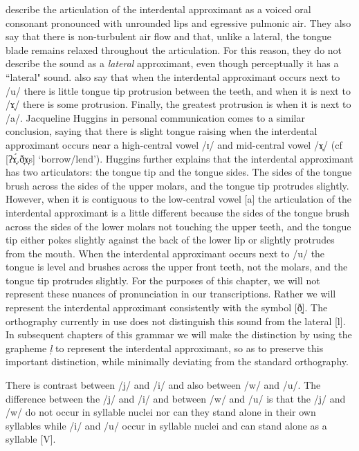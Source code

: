 \citet{olson2010} describe the articulation of the interdental approximant as a voiced oral consonant pronounced with unrounded lips and egressive pulmonic air. They also say that there is non-turbulent air flow and that, unlike a lateral, the tongue blade remains relaxed throughout the articulation. For this reason, they do not describe the sound as a \textit{lateral} approximant, even though perceptually it has a ``lateral" sound. 
\citet{olson2008} also say that when the interdental approximant occurs next to /u/ there is little tongue tip protrusion between the teeth, and when it is next to /ɤ̞/ there is some protrusion. Finally, the greatest protrusion is when it is next to /a/. Jacqueline Huggins in personal communication comes to a similar conclusion, saying that there is slight tongue raising when the interdental approximant occurs near a high-central vowel /ɪ/ and mid-central vowel /ɤ̞/ (cf [ʔɤ̞́.ð̞ɤ̞s] `borrow/lend'). Huggins further explains that the interdental approximant has two articulators: the tongue tip and the tongue sides. The sides of the tongue brush across the sides of the upper molars, and the tongue tip protrudes slightly. However, when it is contiguous to the low-central vowel [a] the articulation of the interdental approximant is a little different because the sides of the tongue brush across the sides of the lower molars not touching the upper teeth, and the tongue tip either pokes slightly against the back of the lower lip or slightly protrudes from the mouth. When the interdental approximant occurs next to /u/ the tongue is level and brushes across the upper front teeth, not the molars, and the tongue tip protrudes slightly. 
For the purposes of this chapter, we will not represent these nuances of pronunciation in our transcriptions. Rather we will represent the interdental approximant consistently with the symbol [ð̞]. The orthography currently in use does not distinguish this sound from the lateral [l]. In subsequent chapters of this grammar we will make the distinction by using the grapheme \textit{ļ} to represent the interdental approximant, so as to preserve this important distinction, while minimally deviating from the standard orthography.

There is contrast between /j/ and /i/ and also between /w/ and /u/. The difference between the /j/ and /i/ and between /w/ and /u/ is that the /j/ and /w/ do not occur in syllable nuclei nor can they stand alone in their own syllables while /i/ and /u/ occur in syllable nuclei and can stand alone as a syllable [V].


